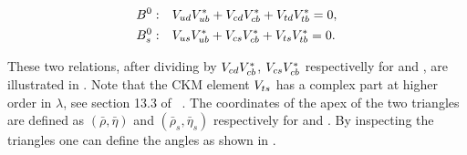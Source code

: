 \begin{subequations}
  \centering
  \label{unitConstraints}
  \begin{align}
    \Bd : & \quad \Vud\Vub^* + \Vcd\Vcb^* + \Vtd\Vtb^* = 0,
    \label{unitConstraints_Bd} \\
    \Bs : & \quad \Vus\Vub^* + \Vcs\Vcb^* + \Vts\Vtb^* = 0.
    \label{unitConstraints_Bs}
  \end{align}
\end{subequations}

\noindent These two relations, after dividing by $V_{cd}V_{cb}^*$, $V_{cs}V_{cb}^*$ respectivelly for \Bd and \Bs, are illustrated in .
Note that the CKM element $V_{ts}$ has a complex part at higher order in $\lambda$, see section 13.3 of ~\cite{PDG}.
The coordinates of the apex of the two triangles are defined as $(\bar{\rho},\bar{\eta})$ and $(\bar{\rho}_s,\bar{\eta}_s)$ respectively for  and
. By inspecting the triangles one can define the angles as shown in .

